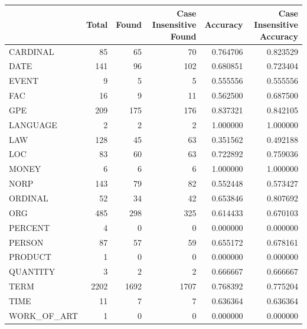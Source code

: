 \begin{tabular}{lrrrrr}
\toprule
 & Total & Found & Case Insensitive Found & Accuracy & Case Insensitive Accuracy \\
\midrule
CARDINAL & 85 & 65 & 70 & 0.764706 & 0.823529 \\
DATE & 141 & 96 & 102 & 0.680851 & 0.723404 \\
EVENT & 9 & 5 & 5 & 0.555556 & 0.555556 \\
FAC & 16 & 9 & 11 & 0.562500 & 0.687500 \\
GPE & 209 & 175 & 176 & 0.837321 & 0.842105 \\
LANGUAGE & 2 & 2 & 2 & 1.000000 & 1.000000 \\
LAW & 128 & 45 & 63 & 0.351562 & 0.492188 \\
LOC & 83 & 60 & 63 & 0.722892 & 0.759036 \\
MONEY & 6 & 6 & 6 & 1.000000 & 1.000000 \\
NORP & 143 & 79 & 82 & 0.552448 & 0.573427 \\
ORDINAL & 52 & 34 & 42 & 0.653846 & 0.807692 \\
ORG & 485 & 298 & 325 & 0.614433 & 0.670103 \\
PERCENT & 4 & 0 & 0 & 0.000000 & 0.000000 \\
PERSON & 87 & 57 & 59 & 0.655172 & 0.678161 \\
PRODUCT & 1 & 0 & 0 & 0.000000 & 0.000000 \\
QUANTITY & 3 & 2 & 2 & 0.666667 & 0.666667 \\
TERM & 2202 & 1692 & 1707 & 0.768392 & 0.775204 \\
TIME & 11 & 7 & 7 & 0.636364 & 0.636364 \\
WORK_OF_ART & 1 & 0 & 0 & 0.000000 & 0.000000 \\
\bottomrule
\end{tabular}
